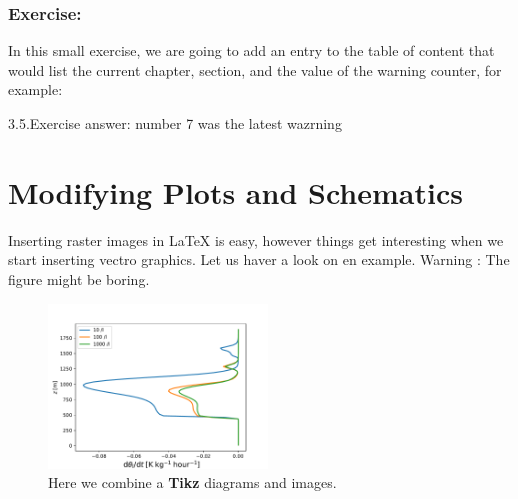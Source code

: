 \documentclass[a4paper,10pt]{report} %
\begin{document}
\subsubsection{Exercise:}
In this small exercise, we are going to add an entry to the table of content that would list the current chapter, section, and the value of the warning counter, for example:\\

\begin{center}
 3.5.Exercise answer: number 7 was the latest wazrning 
\end{center}




\newpage 
 \section{Modifying Plots and Schematics}\label{sec:figures}
 
 Inserting raster images in LaTeX is easy, however things get interesting when we start inserting vectro graphics. Let us haver a look on en example. Warning :  The figure might be boring.\\
 \begin{figure}[!ht] 
     \includegraphics[width=0.52\textwidth]{./figures/prof_tend.pdf}
        \caption[Diagrams and plots]{Here we combine a \textbf{Tikz} diagrams and images.}    
      \label{fig:figures}    
 \end{figure}
 
\end{document}

